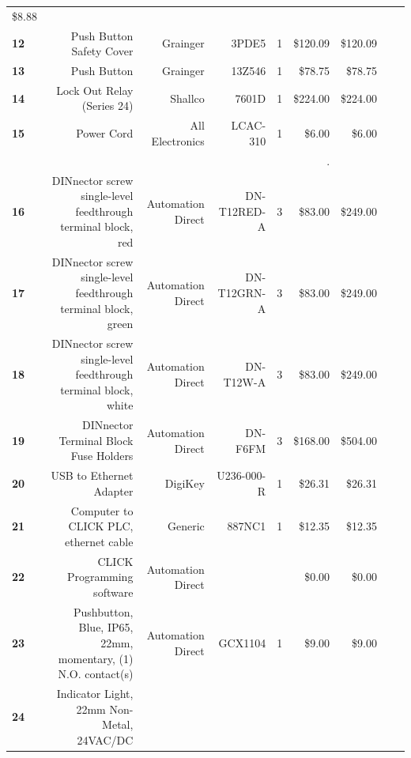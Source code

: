 \begin{table}[!htp]
{\begin{tabular}{lrrrrrrrr}
      \$8.88         \\
      \textbf{12}    & Push Button Safety Cover
      & Grainger          & 3PDE5             & 1        & \$120.09 &
      \$120.09       \\
      \textbf{13}    & Push Button
      & Grainger          & 13Z546            & 1        & \$78.75  &
      \$78.75        \\
      \textbf{14}    & Lock Out Relay (Series 24)
      & Shallco           & 7601D             & 1        & \$224.00 &
      \$224.00       \\
      \textbf{15}    & Power Cord
      & All Electronics   & LCAC-310          & 1        & \$6.00   &
      \$6.00         \\
      \textbf{}      &
      &                   &                   &          & .        &
      \\
      \textbf{16}    & DINnector screw single-level feedthrough
      terminal block, red      & Automation Direct & DN-T12RED-A
      & 3        & \$83.00  & \$249.00       \\
      \textbf{17}    & DINnector screw single-level feedthrough
      terminal block, green    & Automation Direct & DN-T12GRN-A
      & 3        & \$83.00  & \$249.00       \\
      \textbf{18}    & DINnector screw single-level feedthrough
      terminal block, white    & Automation Direct & DN-T12W-A
      & 3        & \$83.00  & \$249.00       \\
      \textbf{19}    & DINnector Terminal Block Fuse Holders
      & Automation Direct & DN-F6FM           & 3        & \$168.00 &
      \$504.00       \\
      \textbf{20}    & USB to Ethernet Adapter
      & DigiKey           & U236-000-R        & 1        & \$26.31  &
      \$26.31        \\
      \textbf{21}    & Computer to CLICK PLC, ethernet cable
      & Generic           & 887NC1            & 1        & \$12.35  &
      \$12.35        \\
      \textbf{22}    & CLICK Programming software
      & Automation Direct &                   &          & \$0.00   &
      \$0.00         \\
      \textbf{23}    & Pushbutton, Blue, IP65, 22mm, momentary, (1)
      N.O. contact(s)      & Automation Direct & GCX1104           &
      1        & \$9.00   & \$9.00         \\
      \textbf{24}    & Indicator Light, 22mm Non-Metal, 24VAC/DC

\end{tabular}}
\end{table}
